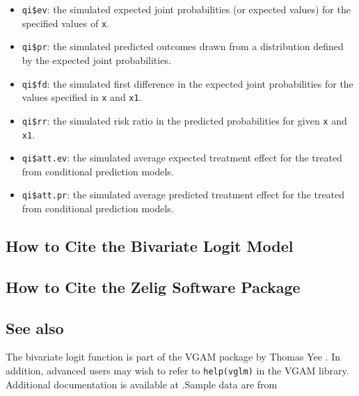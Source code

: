 \documentclass{article}
\begin{document}
\begin{itemize}
   \begin{itemize}
   \item {\tt qi\$ev}: the simulated expected joint probabilities (or expected
     values) for the specified values of {\tt x}.  
   \item {\tt qi\$pr}: the simulated predicted outcomes drawn from a
     distribution defined by the expected joint probabilities.
   \item {\tt qi\$fd}: the simulated first difference in the
     expected joint probabilities for the values specified in {\tt x} and
     {\tt x1}.
   \item {\tt qi\$rr}: the simulated risk ratio in the predicted
     probabilities for given {\tt x} and {\tt x1}.
   \item {\tt qi\$att.ev}: the simulated average expected treatment
     effect for the treated from conditional prediction models.  
   \item {\tt qi\$att.pr}: the simulated average predicted treatment
     effect for the treated from conditional prediction models.  
   \end{itemize}
\end{itemize}

\subsection*{How to Cite the Bivariate Logit Model}

\subsection*{How to Cite the Zelig Software Package}
\CiteZelig


\subsection*{See also}
The bivariate logit function is part of the VGAM package by Thomas Yee \citep{YeeHas03}. In addition, advanced users may wish to refer to \texttt{help(vglm)} 
in the VGAM library.  Additional documentation is available at
.Sample data are from \cite{Martin92}




 
\end{document}
